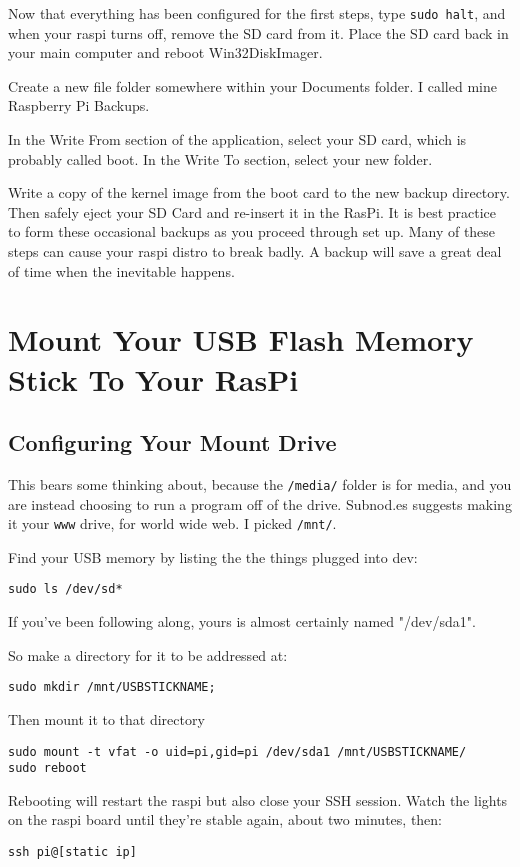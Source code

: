 Now that everything has been configured for the first steps, type \texttt{sudo halt}, and when your raspi turns off, remove the SD card from it. Place the SD card back in your main computer and reboot Win32DiskImager.

Create a new file folder somewhere within your Documents folder. I called mine Raspberry Pi Backups.

In the Write From section of the application, select your SD card, which is probably called boot. In the Write To section, select your new folder. 

Write a copy of the kernel image from the boot card to the new backup directory. Then safely eject your SD Card and re-insert it in the RasPi. It is best practice to form these occasional backups as you proceed through set up. Many of these steps can cause your raspi distro to break badly. A backup will save a great deal of time when the inevitable happens.

\section{Mount Your USB Flash Memory Stick To Your RasPi}

\subsection{Configuring Your Mount Drive}
This bears some thinking about, because the \texttt{/media/} folder is for media, and you are instead choosing to run a program off of the drive. Subnod.es suggests making it your \texttt{www} drive, for world wide web. I picked \texttt{/mnt/}.

Find your USB memory by listing the the things plugged into dev:
\begin{lstlisting}
sudo ls /dev/sd*
\end{lstlisting}

If you've been following along, yours is almost certainly named "/dev/sda1".

So make a directory for it to be addressed at:
\begin{lstlisting}
sudo mkdir /mnt/USBSTICKNAME;
\end{lstlisting}

Then mount it to that directory
\begin{lstlisting}
sudo mount -t vfat -o uid=pi,gid=pi /dev/sda1 /mnt/USBSTICKNAME/
sudo reboot
\end{lstlisting}

Rebooting will restart the raspi but also close your SSH session. Watch the lights on the raspi board until they're stable again, about two minutes, then:
\begin{lstlisting}
ssh pi@[static ip]
\end{lstlisting}

